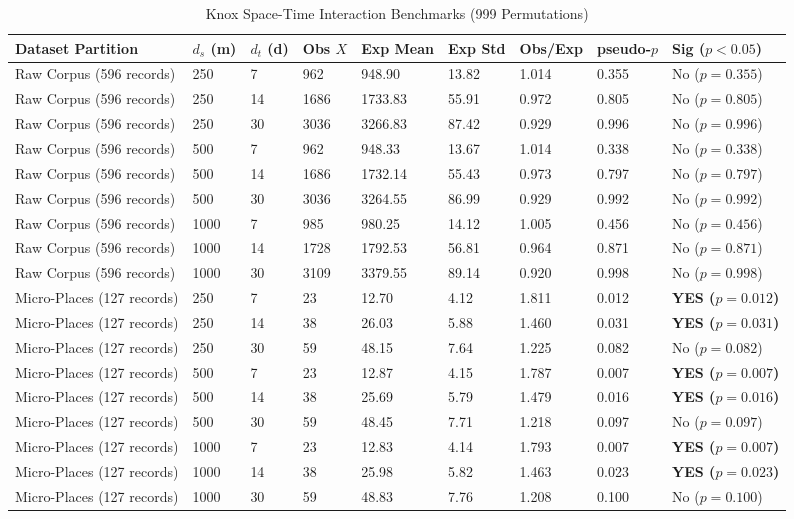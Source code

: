 \documentclass[conference]{IEEEtran}
\begin{document}
\begin{table}[t]
\centering
\caption{Knox Space-Time Interaction Benchmarks (999 Permutations)}
\label{tab:knox}
\begin{tabular}{lllllllll}
\toprule
\textbf{Dataset Partition} & \textbf{$d_s$ (m)} & \textbf{$d_t$ (d)} & \textbf{Obs $X$} & \textbf{Exp Mean} & \textbf{Exp Std} & \textbf{Obs/Exp} & \textbf{pseudo-$p$} & \textbf{Sig ($p < 0.05$)} \\
\midrule
Raw Corpus (596 records) & 250 & 7 & 962 & 948.90 & 13.82 & 1.014 & 0.355 & No ($p=0.355$) \\
Raw Corpus (596 records) & 250 & 14 & 1686 & 1733.83 & 55.91 & 0.972 & 0.805 & No ($p=0.805$) \\
Raw Corpus (596 records) & 250 & 30 & 3036 & 3266.83 & 87.42 & 0.929 & 0.996 & No ($p=0.996$) \\
Raw Corpus (596 records) & 500 & 7 & 962 & 948.33 & 13.67 & 1.014 & 0.338 & No ($p=0.338$) \\
Raw Corpus (596 records) & 500 & 14 & 1686 & 1732.14 & 55.43 & 0.973 & 0.797 & No ($p=0.797$) \\
Raw Corpus (596 records) & 500 & 30 & 3036 & 3264.55 & 86.99 & 0.929 & 0.992 & No ($p=0.992$) \\
Raw Corpus (596 records) & 1000 & 7 & 985 & 980.25 & 14.12 & 1.005 & 0.456 & No ($p=0.456$) \\
Raw Corpus (596 records) & 1000 & 14 & 1728 & 1792.53 & 56.81 & 0.964 & 0.871 & No ($p=0.871$) \\
Raw Corpus (596 records) & 1000 & 30 & 3109 & 3379.55 & 89.14 & 0.920 & 0.998 & No ($p=0.998$) \\
\midrule
Micro-Places (127 records) & 250 & 7 & 23 & 12.70 & 4.12 & 1.811 & 0.012 & \textbf{YES ($p=0.012$)} \\
Micro-Places (127 records) & 250 & 14 & 38 & 26.03 & 5.88 & 1.460 & 0.031 & \textbf{YES ($p=0.031$)} \\
Micro-Places (127 records) & 250 & 30 & 59 & 48.15 & 7.64 & 1.225 & 0.082 & No ($p=0.082$) \\
Micro-Places (127 records) & 500 & 7 & 23 & 12.87 & 4.15 & 1.787 & 0.007 & \textbf{YES ($p=0.007$)} \\
Micro-Places (127 records) & 500 & 14 & 38 & 25.69 & 5.79 & 1.479 & 0.016 & \textbf{YES ($p=0.016$)} \\
Micro-Places (127 records) & 500 & 30 & 59 & 48.45 & 7.71 & 1.218 & 0.097 & No ($p=0.097$) \\
Micro-Places (127 records) & 1000 & 7 & 23 & 12.83 & 4.14 & 1.793 & 0.007 & \textbf{YES ($p=0.007$)} \\
Micro-Places (127 records) & 1000 & 14 & 38 & 25.98 & 5.82 & 1.463 & 0.023 & \textbf{YES ($p=0.023$)} \\
Micro-Places (127 records) & 1000 & 30 & 59 & 48.83 & 7.76 & 1.208 & 0.100 & No ($p=0.100$) \\
\bottomrule
\end{tabular}
\end{table}
\end{document}

